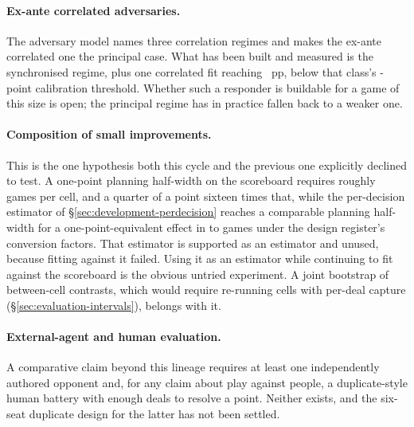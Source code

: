 \paragraph{Ex-ante correlated adversaries.} The adversary model names three correlation regimes and
makes the ex-ante correlated one the principal case. What has been built and measured is the
synchronised regime, plus one correlated fit reaching \vsevenCorrelatedFit{}~pp, below that class's
\vsevenCorrelatedFloor{}-point calibration threshold. Whether such a responder is buildable for a
game of this size is open; the principal regime has in practice fallen back to a weaker one.

\paragraph{Composition of small improvements.} This is the one hypothesis both this cycle and the
previous one explicitly declined to test. A one-point planning half-width on the scoreboard
requires roughly \vsevenScoreboardGames{} games per cell, and a quarter of a point sixteen times
that, while the per-decision estimator of \S\ref{sec:development-perdecision} reaches a comparable
planning half-width for a one-point-equivalent effect in \vsevenPerDecisionGamesLo{} to
\vsevenPerDecisionGamesHi{} games under the design register's conversion factors. That estimator is
supported as an estimator and unused, because fitting against it failed. Using it as an estimator
while continuing to fit against the scoreboard is the obvious untried experiment. A joint bootstrap
of between-cell contrasts, which would require re-running cells with per-deal capture
(\S\ref{sec:evaluation-intervals}), belongs with it.

\paragraph{External-agent and human evaluation.} A comparative claim beyond this lineage requires at
least one independently authored opponent and, for any claim about play against people, a
duplicate-style human battery with enough deals to resolve a point. Neither exists, and the six-seat
duplicate design for the latter has not been settled.


